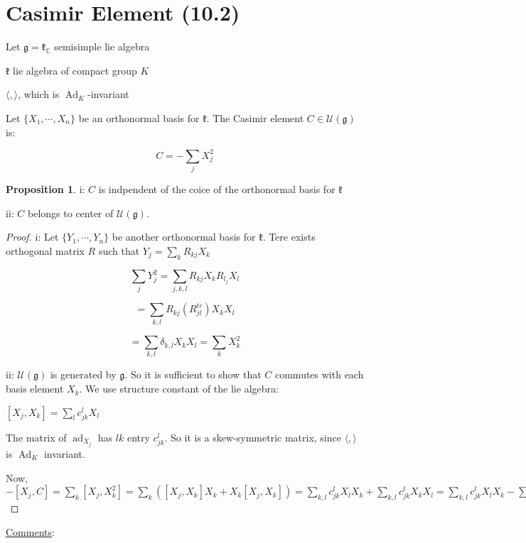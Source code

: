 \documentclass{article}
\theoremstyle{definition}
\newtheorem{proposition}{Proposition}
\newcommand{\ad}{\operatorname{ad}}
\newcommand{\Ad}{\operatorname{Ad}}
\begin{document}
\section*{Casimir Element (10.2)}

Let \(\mathfrak{g} = \mathfrak{k}_\mathbb{C}\) semisimple lie algebra

\(\mathfrak{k}\) lie algebra of compact group \(K\) 

\(\langle , \rangle \), which is \(\Ad_K\)-invariant 

Let \(\{ X_1,\cdots, X_n \} \) be an orthonormal basis for \(\mathfrak{k}\). The Casimir element \(C\in \mathcal{U}(\mathfrak{g})\) is:

\[
    C = - \sum_{j} X_j ^2
\]

\begin{proposition}
    i: \(C\) is indpendent of the coice of the orthonormal basis for \(\mathfrak{k}\)
    
    ii: \(C\) belongs to center of \(\mathcal{U}(\mathfrak{g})\). 
\end{proposition}

\begin{proof}
    i: Let \(\{ Y_1,\cdots,Y_n \}\) be another orthonormal basis for \(\mathfrak{k}\). Tere exists orthogonal matrix \(R\) such that \(Y_j = \sum_{k} R_{kj}X_k\)
    
    \[
        \sum_{j} Y_j^2 = \sum_{j,k,l} R_{kj}X_k R_{l_j}X_l
    \]

    \[
        =\sum_{k,l} R_{kj}(R^{tr}_{jl})X_k X_l 
    \]

    \[
        = \sum_{k,l} \delta_{k,l} X_k X_l = \sum_{k} X_k^2 
    \]

    ii: \(\mathcal{U}(\mathfrak{g})\) is generated by \(\mathfrak{g}\). So it is sufficient to show that \(C\) commutes with each basis element \(X_k\). We use structure constant of the lie algebra:

    \([X_j,X_k] = \sum_{l} c_{jk}^l X_l\)
    
    The matrix of \(\ad_{X_j}\) has \(lk\) entry \(c_{jk}^l\). So it is a skew-symmetric matrix, since \(\langle , \rangle\) is \(\Ad_K\) invariant.

    Now, \(-[X_j,C]=\sum_{k} [X_j,X_k^2]=\sum_{k} ([X_j,X_k]X_k + X_k[X_j,X_k])=\sum_{k,l} c_{jk}^l X_l X_k + \sum_{k,l} c_{jk}^l X_k X_l=\sum_{k,l}c^l_{jk}X_l X_k - \sum_{k,l} c^{l}_{jk}X_l X_k = 0\)

\end{proof}

\underline{Comments}:
\end{document}
